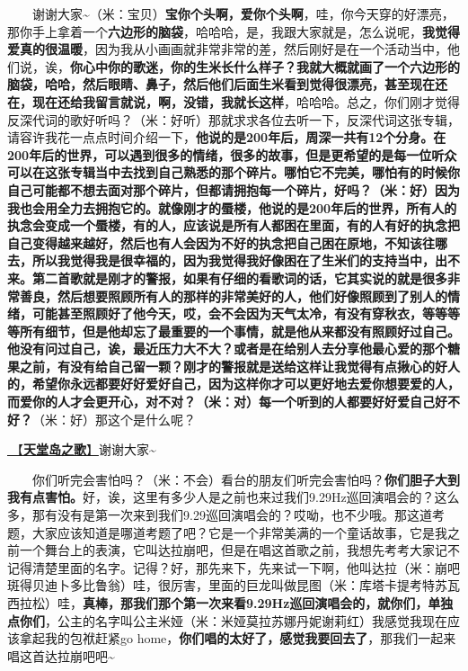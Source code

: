 \documentclass[]{ctexbook}
\begin{document}
  谢谢大家\textasciitilde（米：宝贝）\textbf{宝你个头啊，爱你个头啊}，哇，你今天穿的好漂亮，那你手上拿着一个\textbf{六边形的脑袋}，哈哈哈，是，我跟大家就是，怎么说呢，\textbf{我觉得爱真的很温暖}，因为我从小画画就非常非常的差，然后刚好是在一个活动当中，他们说，诶，\textbf{你心中你的歌迷，你的生米长什么样子？我就大概就画了一个六边形的脑袋，哈哈，然后眼睛、鼻子，然后他们后面生米看到觉得很漂亮，甚至现在还在，现在还给我留言就说，啊，没错，我就长这样}，哈哈哈。总之，你们刚才觉得反深代词的歌好听吗？（米：好听）那就求求各位去听一下，反深代词这张专辑，请容许我花一点点时间介绍一下，\textbf{他说的是200年后，周深一共有12个分身。在200年后的世界，可以遇到很多的情绪，很多的故事，但是更希望的是每一位听众可以在这张专辑当中去找到自己熟悉的那个碎片。哪怕它不完美，哪怕有的时候你自己可能都不想去面对那个碎片，但都请拥抱每一个碎片，好吗？（米：好）因为我也会用全力去拥抱它的。就像刚才的蜃楼，他说的是200年后的世界，所有人的执念会变成一个蜃楼，有的人，应该说是所有人都困在里面，有的人有好的执念把自己变得越来越好，然后也有人会因为不好的执念把自己困在原地，不知该往哪去，所以我觉得我是很幸福的，因为我觉得我好像困在了生米们的支持当中，出不来。第二首歌就是刚才的警报，如果有仔细的看歌词的话，它其实说的就是很多非常善良，然后想要照顾所有人的那样的非常美好的人，他们好像照顾到了别人的情绪，可能甚至照顾好了他今天，哎，会不会因为天气太冷，有没有穿秋衣，等等等等所有细节，但是他却忘了最重要的一个事情，就是他从来都没有照顾好过自己。他没有问过自己，诶，最近压力大不大？或者是在给别人去分享他最心爱的那个糖果之前，有没有给自己留一颗？刚才的警报就是送给这样让我觉得有点揪心的好人的，希望你永远都要好好爱好自己，因为这样你才可以更好地去爱你想要爱的人，而爱你的人才会更开心，对不对？（米：对）每一个听到的人都要好好爱自己好不好？}（米：好）那这个是什么呢？

\hyperref[haven-song]{🎵【\textbf{天堂岛之歌}】}谢谢大家\textasciitilde{}

  你们听完会害怕吗？（米：不会）看台的朋友们听完会害怕吗？\textbf{你们胆子大到我有点害怕。}好，诶，这里有多少人是之前也来过我们9.29Hz巡回演唱会的？这么多，那有没有是第一次来到我们9.29巡回演唱会的？哎呦，也不少哦。那这道考题，大家应该知道是哪道考题了吧？它是一个非常美满的一个童话故事，它是我之前一个舞台上的表演，它叫达拉崩吧，但是在唱这首歌之前，我想先考考大家记不记得清楚里面的名字。记得？好，那先来下，先来试一下啊，他叫达拉（米：崩吧斑得贝迪卜多比鲁翁）哇，很厉害，里面的巨龙叫做昆图（米：库塔卡提考特苏瓦西拉松）哇，\textbf{真棒，那我们那个第一次来看9.29Hz巡回演唱会的，就你们，单独点你们}，公主的名字叫公主米娅（米：米娅莫拉苏娜丹妮谢莉红）我感觉我现在应该拿起我的包袱赶紧go home，\textbf{你们唱的太好了，感觉我要回去了}，那我们一起来唱这首达拉崩吧吧\textasciitilde{}
\end{document}
